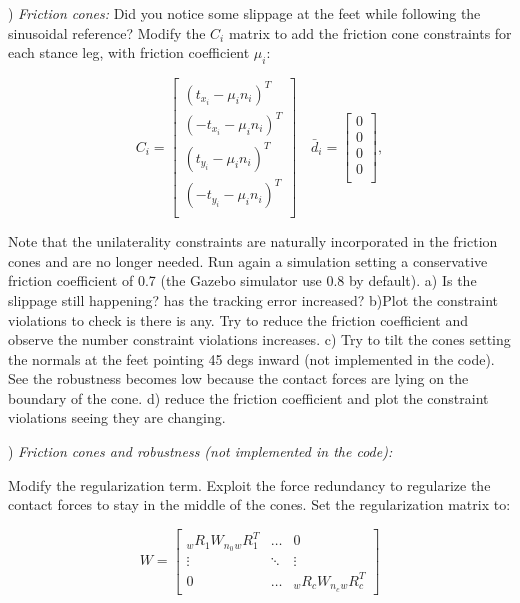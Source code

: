 \documentclass{report}
\newcommand{\mat}[1]{\ensuremath{\begin{bmatrix}#1\end{bmatrix}}}	%
\begin{document}
\quad

) \textit{Friction cones:}
Did you notice  some slippage at the feet while following the sinusoidal reference?
Modify the $C_i$ matrix to add the friction cone constraints for each stance leg, with friction coefficient $\mu_i$:

\begin{equation}
C_i = \left[ \begin{matrix} 
(t_{x_i} -\mu_i n_i)^T \\
(-t_{x_i} -\mu_i n_i)^T \\
(t_{y_i} -\mu_i n_i)^T \\
(-t_{y_i} -\mu_i n_i)^T \\
\end{matrix}\right] 
\quad
\bar{d}_i = \left[ \begin{matrix} 
0 \\
0 \\ 
0 \\
0\\
\end{matrix}\right],
\label{eq:inequality_matrix}
\end{equation}

Note that the unilaterality constraints are naturally incorporated in the friction cones and are no longer needed.
Run again a simulation setting a conservative friction coefficient of 0.7 (the Gazebo simulator use 0.8 by default).
a) Is the slippage still happening? has the tracking error increased?
b)Plot the constraint violations to check is there is any. Try to reduce the friction coefficient and observe 
the number constraint violations increases. 
c) Try to tilt the cones setting the normals at the feet pointing 45 degs inward (not implemented in the code). 
See the robustness becomes low because the contact forces are lying on the boundary of the cone. 
d) reduce the friction coefficient and plot the constraint violations seeing they are changing. 


\quad

) \textit{Friction cones and robustness  (not implemented in the code):}

Modify the regularization term. Exploit the force redundancy to regularize the contact forces to stay in the middle of the cones. 
Set the regularization matrix to:

\begin{equation}
W = \mat{ {}_wR_1 W_{n_0} {}_wR_1^T &  \dots & 0 \\ \vdots & \ddots & \vdots \\ 0 & \dots &    {}_wR_c W_{n_c} {}_wR_c^T }
\end{equation}
\end{document}
